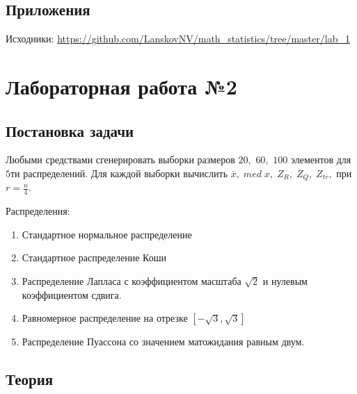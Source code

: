 \documentclass[12pt]{report}
\begin{document}
\section{Приложения}

Исходники: \url{https://github.com/LanskovNV/math_statistics/tree/master/lab_1}


\chapter{Лабораторная работа №2}
\section{Постановка задачи}
Любыми средствами сгенерировать выборки размеров $20,$ $60,$ $100$ элементов для $5$ти распределений. Для каждой выборки вычислить $\overline{x},\; med\; x,\; Z_R,\; Z_Q,\; Z_{tr},$ при $r = \frac{n}{4}.$

Распределения:
\begin{enumerate}
\item Стандартное нормальное распределение
\item Стандартное распределение Коши
\item Распределение Лапласа с коэффициентом масштаба $\sqrt{2}$ и нулевым коэффициентом сдвига.
\item Равномерное распределение на отрезке $\left[-\sqrt{3}, \sqrt{3}\right]$
\item Распределение Пуассона со значением матожидания равным двум.
\end{enumerate}

\section{Теория}
\end{document}
